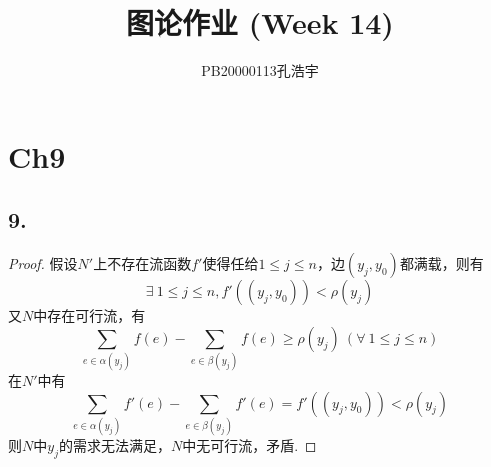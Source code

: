 \documentclass{article}
\title{图论作业 (Week 14)}
\author{PB20000113孔浩宇}
\begin{document}
\maketitle
\section*{Ch9}
\subsection*{9.}
\begin{proof}
    假设$N'$上不存在流函数$f'$使得任给$1\leq j\leq n$，边$(y_j , y_0)$都满载，则有
    \[
        \exists\ 1\leq j \leq n , f'((y_j,y_0))< \rho (y_j)
    \]
    又$N$中存在可行流，有
    \[
        \sum\limits_{e\in \alpha(y_j)} f(e) - \sum \limits_{e\in \beta(y_j)} f(e)\geq \rho(y_j)
        \ (\forall\ 1\leq j \leq n)
    \]
    在$N'$中有
    \[
        \sum\limits_{e\in \alpha(y_j)} f'(e) - \sum \limits_{e\in \beta(y_j)} f'(e)
        =f'((y_j,y_0)) < \rho (y_j)
    \]
    则$N$中$y_j$的需求无法满足，$N$中无可行流，矛盾.
\end{proof}
\end{document}

